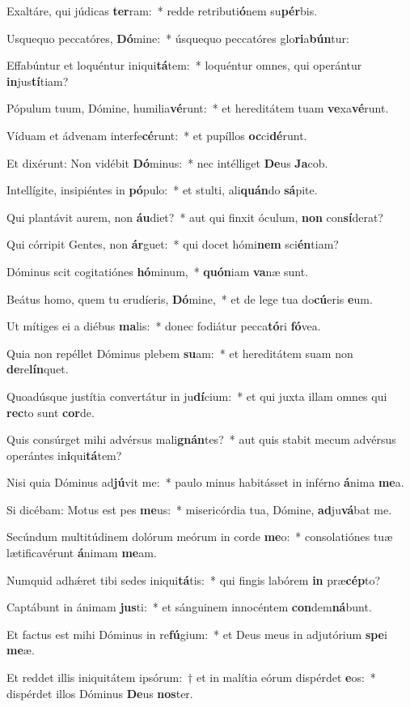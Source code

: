 \item Exaltáre, qui júdicas \textbf{ter}ram:~* redde retributi\textbf{ó}nem su\textbf{pér}bis.
\item Usquequo peccatóres, \textbf{Dó}mine:~* úsquequo peccatóres glo\textbf{ri}a\textbf{bún}tur:
\item Effabúntur et loquéntur iniqui\textbf{tá}tem:~* loquéntur omnes, qui operántur \textbf{in}jus\textbf{tí}tiam?
\item Pópulum tuum, Dómine, humilia\textbf{vé}runt:~* et hereditátem tuam \textbf{ve}xa\textbf{vé}runt.
\item Víduam et ádvenam interfe\textbf{cé}runt:~* et pupíllos \textbf{oc}ci\textbf{dé}runt.
\item Et dixérunt: Non vidébit \textbf{Dó}minus:~* nec intélliget \textbf{De}us \textbf{Ja}cob.
\item Intellígite, insipiéntes in \textbf{pó}pulo:~* et stulti, ali\textbf{quán}do \textbf{sá}pite.
\item Qui plantávit aurem, non \textbf{áu}diet?~* aut qui finxit óculum, \textbf{non} con\textbf{sí}derat?
\item Qui córripit Gentes, non \textbf{ár}guet:~* qui docet hómi\textbf{nem} sci\textbf{én}tiam?
\item Dóminus scit cogitatiónes \textbf{hó}minum,~* \textbf{quón}iam \textbf{va}næ sunt.
\item Beátus homo, quem tu erudíeris, \textbf{Dó}mine,~* et de lege tua do\textbf{cú}eris \textbf{e}um.
\item Ut mítiges ei a diébus \textbf{ma}lis:~* donec fodiátur pecca\textbf{tó}ri \textbf{fó}vea.
\item Quia non repéllet Dóminus plebem \textbf{su}am:~* et hereditátem suam non \textbf{de}re\textbf{lín}quet.
\item Quoadúsque justítia convertátur in ju\textbf{dí}cium:~* et qui juxta illam omnes qui \textbf{rec}to sunt \textbf{cor}de.
\item Quis consúrget mihi advérsus mali\textbf{gnán}tes?~* aut quis stabit mecum advérsus operántes in\textbf{i}qui\textbf{tá}tem?
\item Nisi quia Dóminus ad\textbf{jú}vit me:~* paulo minus habitásset in inférno \textbf{á}nima \textbf{me}a.
\item Si dicébam: Motus est pes \textbf{me}us:~* misericórdia tua, Dómine, \textbf{ad}ju\textbf{vá}bat me.
\item Secúndum multitúdinem dolórum meórum in corde \textbf{me}o:~* consolatiónes tuæ lætificavérunt \textbf{á}nimam \textbf{me}am.
\item Numquid adhǽret tibi sedes iniqui\textbf{tá}tis:~* qui fingis labórem \textbf{in} præ\textbf{cép}to?
\item Captábunt in ánimam \textbf{jus}ti:~* et sánguinem innocéntem \textbf{con}dem\textbf{ná}bunt.
\item Et factus est mihi Dóminus in re\textbf{fú}gium:~* et Deus meus in adjutórium \textbf{spe}i \textbf{me}æ.
\item Et reddet illis iniquitátem ipsórum:~† et in malítia eórum dispérdet \textbf{e}os:~* dispérdet illos Dóminus \textbf{De}us \textbf{nos}ter.
